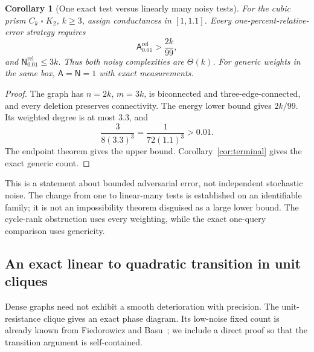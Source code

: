 \documentclass[11pt,letterpaper]{article}
\newtheorem{corollary}[theorem]{Corollary}
\newcommand{\A}{\mathsf A}
\newcommand{\N}{\mathsf N}
\begin{document}
\begin{corollary}[One exact test versus linearly many noisy tests]\label{cor:prism}
For the cubic prism $C_k\mathbin{\square}K_2$, $k\ge3$, assign conductances in $[1,1.1]$. Every one-percent-relative-error strategy requires
\[
 \A^{\mathrm{rel}}_{0.01}>\frac{2k}{99},
\]
and $\N^{\mathrm{rel}}_{0.01}\le3k$. Thus both noisy complexities are $\Theta(k)$. For generic weights in the same box, $\A=\N=1$ with exact measurements.
\end{corollary}
\begin{proof}
The graph has $n=2k$, $m=3k$, is biconnected and three-edge-connected, and every deletion preserves connectivity. The energy lower bound gives $2k/99$. Its weighted degree is at most $3.3$, and
\[
 \frac3{8(3.3)^3}=\frac1{72(1.1)^3}>0.01.
\]
The endpoint theorem gives the upper bound. Corollary~\ref{cor:terminal} gives the exact generic count.
\end{proof}

This is a statement about bounded adversarial error, not independent stochastic noise. The change from one to linear-many tests is established on an identifiable family; it is not an impossibility theorem disguised as a large lower bound. The cycle-rank obstruction uses every weighting, while the exact one-query comparison uses genericity.

\subsection{An exact linear to quadratic transition in unit cliques}
Dense graphs need not exhibit a smooth deterioration with precision. The unit-resistance clique gives an exact phase diagram. Its low-noise fixed count is already known from Fiedorowicz and Basu~\cite{FB}; we include a direct proof so that the transition argument is self-contained.
\end{document}
